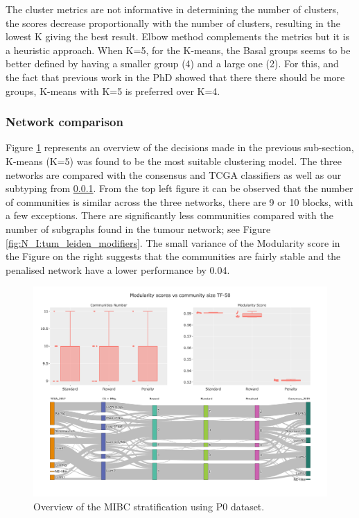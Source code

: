 The cluster metrics are not informative in determining the number of clusters, the scores decrease proportionally with the number of clusters, resulting in the lowest K giving the best result. Elbow method complements the metrics but it is a heuristic approach. When K=5, for the K-means, the Basal groups seems to be better defined by having a smaller group (4) and a large one (2). For this, and the fact that previous work in the PhD showed that there there should be more groups, K-means with K=5 is preferred over K=4.

\subsubsection{Network comparison}


Figure \ref{fig:N_I:p0_sky_leiden} represents an overview of the decisions made in the previous sub-section, K-means (K=5) was found to be the most suitable clustering model. The three networks are compared with the consensus and TCGA classifiers \citet{Kamoun2020-tj, Robertson2017-mg} as well as our subtyping from \ref{}. From the top left figure it can be observed that the number of communities is similar across the three networks, there are 9 or 10 blocks, with a few exceptions. There are significantly less communities compared with the number of subgraphs found in the tumour network; see Figure \ref{fig:N_I:tum_leiden_modifiers}. The small variance of the Modularity score in the Figure on the right suggests that the communities are fairly stable and the penalised network have a lower performance by 0.04.

\begin{figure}[!t]    
    \centering
    \includegraphics[width=1.0\textwidth,height=0.7\textheight,keepaspectratio]{Sections/Network_I/Resources/P0/Ldn_Sky_TF_50_RawKMeans_K5_v3.png}
    \caption{Overview of the MIBC stratification using P0 dataset.}
    \label{fig:N_I:p0_sky_leiden}
\end{figure}

